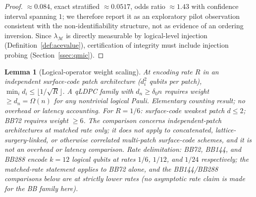 \documentclass[pdflatex,sn-mathphys-num]{sn-jnl}
\theoremstyle{thmstyleone}
\newtheorem{lemma}[theorem]{Lemma}
\theoremstyle{thmstyletwo}
\theoremstyle{thmstylethree}
\begin{document}
\begin{proof}
$\approx0.084$, exact stratified $\approx0.0517$, odds ratio $\approx1.43$ with confidence interval spanning $1$; we therefore report it as an exploratory pilot observation consistent with the non-identifiability structure, not as evidence of an ordering inversion. Since $\lambda_{\mathcal{M}}$ is directly measurable by logical-level injection (Definition~\ref{def:acevalue}), certification of integrity must include injection probing (Section~\ref{ssec:qmic}).
\end{proof}

\begin{lemma}[Logical-operator weight scaling]\label{lem:separation}
At encoding rate $R$ in an independent surface-code patch architecture ($d_i^2$ qubits per patch), $\min_i d_i\le\lfloor1/\!\sqrt{R}\rfloor$. A qLDPC family with $d_n\ge\delta_0 n$ requires weight $\ge d_n=\Omega(n)$ for any nontrivial logical Pauli. \emph{Elementary counting result; no overhead or latency accounting.} For $R=1/6$: surface-code weakest patch $d\le2$; BB72 requires weight $\ge6$. The comparison concerns independent-patch architectures at matched rate only; it does not apply to concatenated, lattice-surgery-linked, or otherwise correlated multi-patch surface-code schemes, and it is not an overhead or latency comparison. \emph{Rate delimitation:} BB72, BB144, and BB288 encode $k=12$ logical qubits at rates $1/6$, $1/12$, and $1/24$ respectively; the matched-rate statement applies to BB72 alone, and the BB144/BB288 comparisons below are at strictly lower rates (no asymptotic rate claim is made for the BB family here).
\end{lemma}
\end{document}
